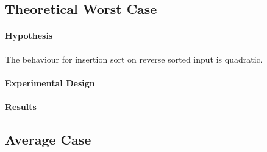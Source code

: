 \documentclass[a4]{article}
\begin{document}
\subsection{Theoretical Worst Case}

\paragraph{Hypothesis} The behaviour for insertion sort on reverse sorted input is quadratic.  


\paragraph{Experimental Design} 








\paragraph{Results} 







\subsection{Average Case}
\end{document}
